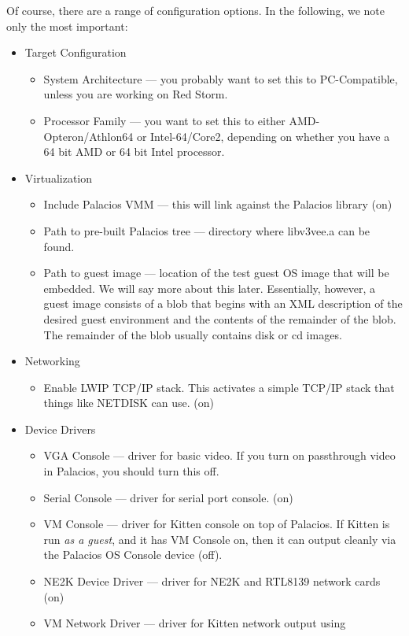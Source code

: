 \documentclass[11pt]{article}
\begin{document}
Of course, there are a range of configuration options.  In the
following, we note only the most important:
\begin{itemize}
\item Target Configuration
\begin{itemize}
\item System Architecture --- you probably want to set this to
PC-Compatible, unless you are working on Red Storm.
\item Processor Family --- you want to set this to either
AMD-Opteron/Athlon64 or Intel-64/Core2, depending on whether you have
a 64 bit AMD or 64 bit Intel processor.
\end{itemize}
\item Virtualization
\begin{itemize}
\item Include Palacios VMM --- this will link against the Palacios
library (on)
\item Path to pre-built Palacios tree --- directory where libv3vee.a
can be found.
\item Path to guest image --- location of the test guest OS
image that will be embedded.  We will say more about this later.
Essentially, however, a guest image consists of a blob that begins
with an XML description of the desired guest environment and the
contents of the remainder of the blob.   The remainder of the blob
usually contains disk or cd images.
\end{itemize}
\item Networking 
\begin{itemize}
\item Enable LWIP TCP/IP stack.  This activates a simple TCP/IP stack
that things like NETDISK can use. (on)
\end{itemize}
\item Device Drivers
\begin{itemize}
\item VGA Console --- driver for basic video.  If you turn on
passthrough video in Palacios, you should turn this off.
\item Serial Console --- driver for serial port console.  (on)
\item VM Console --- driver for Kitten console on top of Palacios.  If
Kitten is run {\em as a guest}, and it has VM Console on, then it can output
cleanly via the Palacios OS Console device (off).
\item NE2K Device Driver --- driver for NE2K and RTL8139 network cards
(on)
\item VM Network Driver --- driver for Kitten network output using

\end{itemize}
\end{itemize}
\end{document}

